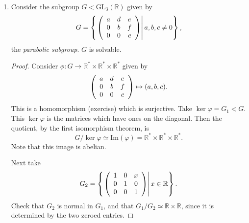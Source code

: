 \documentclass{article}
\begin{document}
\begin{xmpl}
\begin{enumerate}
  \item{Consider the subgroup $G < \mathrm{GL}_3(\mathbb{R})$ given by
      $$
      G = \left\{\left.
          \left(\begin{array}{c c c}
            a & d & e \\ 0 & b & f \\ 0 & 0 & c
          \end{array}\right)\right|a, b, c \neq 0\right\},
      $$
      the \emph{parabolic subgroup}. $G$ is solvable.

      \begin{proof}
        Consider $\phi : G 
                     \to \mathbb{R}^* \times \mathbb{R}^* \times \mathbb{R}^*$
        given by
        $$
        \left(\begin{array}{c c c}
          a & d & e \\ 0 & b & f \\ 0 & 0 & c
        \end{array}\right) \mapsto (a,b,c).
        $$
        This is a homomorphism (exercise) which is
        surjective. Take $\ker \varphi = G_1 \triangleleft G$.
        This $\ker \varphi$ is the matrices which have ones on the
        diagonal. Then the quotient, by the first isomorphism theorem, is
        $$
        G / \ker \varphi 
          \simeq \mathrm{Im}(\varphi)
          = \mathbb{R}^* \times \mathbb{R}^* \times \mathbb{R}^*.
        $$
        Note that this image is abelian.

        Next take
        $$
         G_2 = 
          \left\{\left.
          \left(\begin{array}{c c c}
            1 & 0 & x \\ 0 & 1 & 0 \\ 0 & 0 & 1
          \end{array}\right)\right| x \in \mathbb{R}\right\}.
        $$
        Check that $G_2$ is normal in $G_1$, and that
        $G_1 / G_2 \simeq \mathbb{R} \times \mathbb{R}$, since it is
        determined by the two zeroed entries.


\end{proof}}
\end{enumerate}
\end{xmpl}
\end{document}
